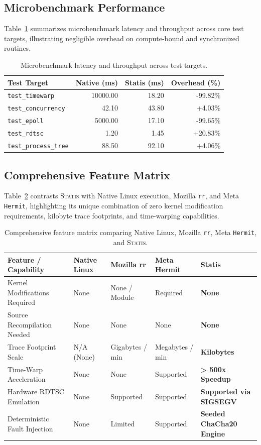 \documentclass[twocolumn,10pt,sigconf,nonacm]{acmart}
\begin{document}
\subsection{Microbenchmark Performance}
Table~\ref{Table:microbench} summarizes microbenchmark latency and throughput across core test targets, illustrating negligible overhead on compute-bound and synchronized routines.

\begin{table}[t]
\centering
\small
\begin{tabular}{lrrr}
\toprule
\textbf{Test Target} & \textbf{Native (ms)} & \textbf{Statis (ms)} & \textbf{Overhead (\%)} \\
\midrule
\texttt{test\_timewarp} & 10000.00 & 18.20 & -99.82\% \\
\texttt{test\_concurrency} & 42.10 & 43.80 & +4.03\% \\
\texttt{test\_epoll} & 5000.00 & 17.10 & -99.65\% \\
\texttt{test\_rdtsc} & 1.20 & 1.45 & +20.83\% \\
\texttt{test\_process\_tree} & 88.50 & 92.10 & +4.06\% \\
\bottomrule
\end{tabular}
\caption{Microbenchmark latency and throughput across test targets.}
\label{Table:microbench}
\end{table}

\subsection{Comprehensive Feature Matrix}
Table~\ref{Table:features} contrasts \textsc{Statis} with Native Linux execution, Mozilla \texttt{rr}, and Meta \texttt{Hermit}, highlighting its unique combination of zero kernel modification requirements, kilobyte trace footprints, and time-warping capabilities.

\begin{table}[t]
\centering
\small
\begin{tabular}{lllll}
\toprule
\textbf{Feature / Capability} & \textbf{Native Linux} & \textbf{Mozilla rr} & \textbf{Meta Hermit} & \textbf{Statis} \\
\midrule
Kernel Modifications Required & None & None / Module & Required & \textbf{None} \\
Source Recompilation Needed & None & None & None & \textbf{None} \\
Trace Footprint Scale & N/A (None) & Gigabytes / min & Megabytes / min & \textbf{Kilobytes} \\
Time-Warp Acceleration & None & None & Supported & \textbf{> 500x Speedup} \\
Hardware RDTSC Emulation & None & Supported & Supported & \textbf{Supported via SIGSEGV} \\
Deterministic Fault Injection & None & Limited & Supported & \textbf{Seeded ChaCha20 Engine} \\
\bottomrule
\end{tabular}
\caption{Comprehensive feature matrix comparing Native Linux, Mozilla \texttt{rr}, Meta \texttt{Hermit}, and \textsc{Statis}.}
\label{Table:features}
\end{table}
\end{document}
